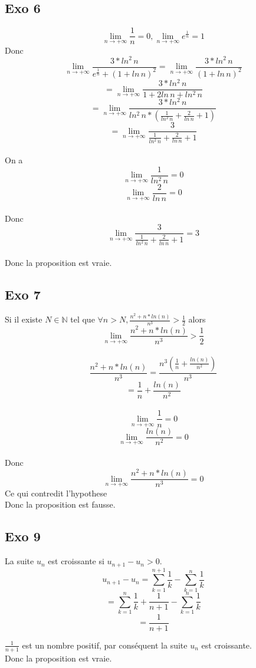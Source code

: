 \documentclass[]{book}
\theoremstyle{definition}
\begin{document}
\subsection*{Exo 6}
$$\lim_{n \to + \infty} \frac{1}{n} = 0, \lim_{n \to + \infty} e^{\frac{1}{n}} = 1$$
Donc
$$\lim_{n \to + \infty} \frac{3*ln^2 \, n}{e^{\frac{1}{n}}+(1+ln \, n)^2} = \lim_{n \to + \infty} \frac{3*ln^2 \, n}{(1+ln \, n)^2}$$
$$=\lim_{n \to + \infty} \frac{3*ln^2 \, n}{1+2ln \, n+ln^2 \, n}$$
$$=\lim_{n \to + \infty} \frac{3*ln^2 \, n}{ln^2 \, n *(\frac {1}{ln^2 \, n}+\frac {2}{ln \, n} +1)}$$
$$=\lim_{n \to + \infty} \frac{3}{\frac {1}{ln^2 \, n}+\frac {2}{ln \, n} +1}$$
\\
On a 
$$\lim_{n \to + \infty} \frac {1}{ln^2 \, n} = 0$$
$$\lim_{n \to + \infty} \frac {2}{ln \, n} = 0$$
\\
Donc
$$\lim_{n \to + \infty} \frac{3}{\frac {1}{ln^2 \, n}+\frac {2}{ln \, n} +1} = 3$$
\\ 
Donc la proposition est vraie.


\subsection*{Exo 7}
Si il existe $N \in \mathbb{N}$ tel que $\forall n > N, \frac{n^2+n*ln(n)}{n^3} > \frac{1}{2}$ alors 
$$ \lim_{n \to + \infty} \frac{n^2+n*ln(n)}{n^3} > \frac{1}{2} $$
\\
$$ \frac{n^2+n*ln(n)}{n^3} = \frac{n^3(\frac{1}{n}+\frac {ln(n)}{n^2})}{n^3}$$
$$= \frac{1}{n}+\frac {ln(n)}{n^2}$$
\\
$$ \lim_{n \to + \infty} \frac{1}{n} = 0 $$
$$ \lim_{n \to + \infty} \frac {ln(n)}{n^2} = 0$$
\\
Donc
$$ \lim_{n \to + \infty} \frac{n^2+n*ln(n)}{n^3} = 0$$
Ce qui contredit l'hypothese
\\ 
Donc la proposition est fausse.


\subsection*{Exo 9}
La suite $u_n$ est croissante si $u_{n+1} - u_{n} > 0$.
$$u_{n+1} - u_{n} = \sum_{k=1}^{n+1} \frac{1}{k} - \sum_{k=1}^{n} \frac{1}{k}$$
$$ = \sum_{k=1}^{n} \frac{1}{k} + \frac{1}{n+1} - \sum_{k=1}^{n} \frac{1}{k}$$
$$ = \frac{1}{n+1} $$

$\frac{1}{n+1}$ est un nombre positif, par cons\'equent la suite $u_n$ est croissante.
\\ 
Donc la proposition est vraie.
\end{document}
